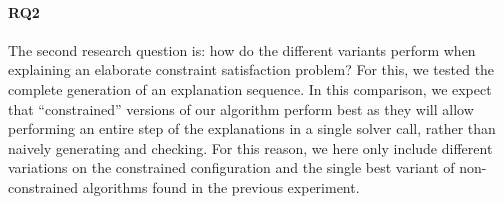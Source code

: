 

\paragraph{RQ2}
The second research question is: how do the different variants perform when explaining an elaborate constraint satisfaction problem? For this, we tested the complete generation of an explanation sequence. 
In this comparison, we expect that ``constrained'' versions of our algorithm perform best as they will allow performing an entire step of the explanations in a single solver call, rather than naively generating and checking. 
For this reason, we here only include different variations on the constrained configuration and the single best variant of non-constrained algorithms found in the previous experiment. 

